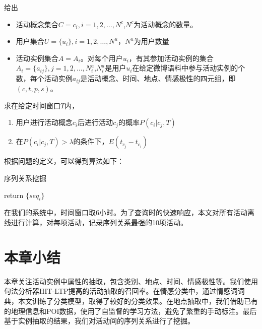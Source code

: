 \begin{problem}[序列关系挖掘]
给出
\begin{itemize}
\item 活动概念集合$C={c_i},i=1,2,\ldots,N^c$,$N^c$为活动概念的数量。
\item 用户集合$U=\{u_i\},i=1,2,\ldots,N^u$，$N^u$为用户数量
\item 活动实例集合$A = {A_i}$。对每个用户$u_i$，有其参加活动实例的集合$A_i = \{a_{ij}\}, j=1,2,\ldots,N_i^a$,$N_i^a$是用户$u_i$在给定微博语料中参与活动实例的个数，每个活动实例$a_{ij}$是活动概念、时间、地点、情感极性的四元组，即$(c,t,p,s)$。
\end{itemize}
求在给定时间窗口$T$内，
\begin{enumerate}
\item 用户进行活动概念$c_i$后进行活动$c_j$的概率$P(c_i|c_j,T)$
\item 在$P(c_i|c_j,T)>\lambda$的条件下，$E(t_{c_j} - t_{c_i})$
\end{enumerate}
\end{problem}

根据问题的定义，可以得到算法如下：

\begin{algorithm}
  \caption{序列关系挖掘}

  return $\{seq_i\}$
\end{algorithm}

在我们的系统中，时间窗口取6小时。为了查询时的快速响应，本文对所有活动离线进行计算，对每项活动，记录序列关系最强的10项活动。

\section{本章小结}
本章关注活动实例中属性的抽取，包含类别、地点、时间、情感极性等。我们使用句法分析器HIT-LTP提高的活动抽取的召回率。在情感分类中，通过情感词词典，本文训练了分类模型，取得了较好的分类效果。在地点抽取中，我们借助已有的地理信息和POI数据，使用了自监督的学习方法，避免了繁重的手动标注。最后基于实例抽取的结果，我们对活动间的序列关系进行了挖掘。

